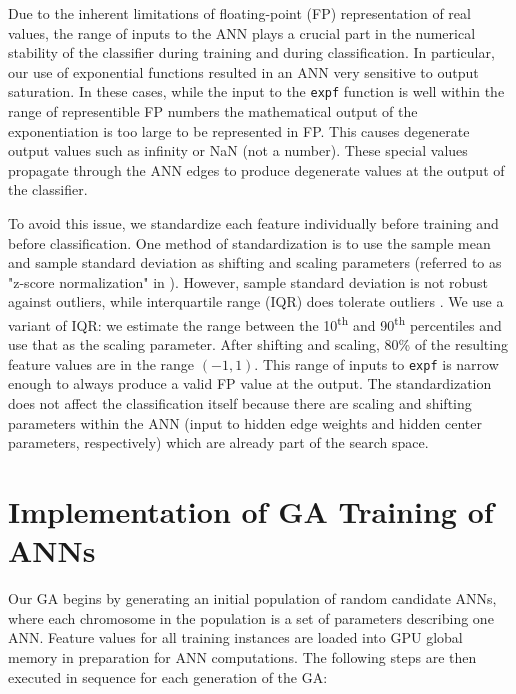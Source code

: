 \documentclass[letterpaper]{jpconf}       %
\begin{document}
Due to the inherent limitations of floating-point (FP) representation of real values, the range of inputs to the ANN plays a crucial part in the numerical stability of the classifier during training and during classification. In particular, our use of exponential functions resulted in an ANN very sensitive to output saturation. In these cases, while the input to the \texttt{expf} function is well within the range of representible FP numbers the mathematical output of the exponentiation is too large to be represented in FP. This causes degenerate output values such as infinity or NaN (not a number). These special values propagate through the ANN edges to produce degenerate values at the output of the classifier.

To avoid this issue, we standardize each feature individually before training and before classification. One method of standardization is to use the sample mean and sample standard deviation as shifting and scaling parameters (referred to as "z-score normalization" in \cite{ZscoreNormalization}). However, sample standard deviation is not robust against outliers, while interquartile range (IQR) does tolerate outliers \cite{RobustRegression}. We use a variant of IQR: we estimate the range between the 10\textsuperscript{th} and 90\textsuperscript{th} percentiles and use that as the scaling parameter. After shifting and scaling, 80\% of the resulting feature values are in the range $(-1, 1)$. This range of inputs to \texttt{expf} is narrow enough to always produce a valid FP value at the output. The standardization does not affect the classification itself because there are scaling and shifting parameters within the ANN (input to hidden edge weights and hidden center parameters, respectively) which are already part of the search space.

\section{Implementation of GA Training of ANNs} \label{algimp}

Our GA begins by generating an initial population of random candidate ANNs, where each chromosome in the population is a set of parameters describing one ANN. Feature values for all training instances are loaded into GPU global memory in preparation for ANN computations. The following steps are then executed in sequence for each generation of the GA:
\end{document}
